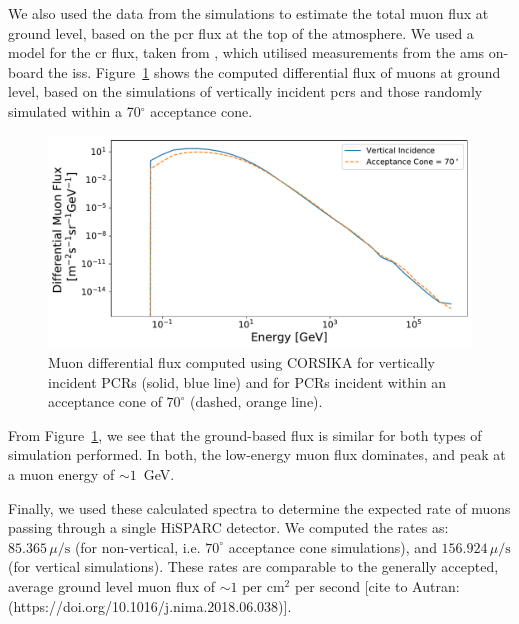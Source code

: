 We also used the data from the simulations to estimate the total muon flux at ground level, based on the \gls{pcr} flux at the top of the atmosphere. We used a model for the \gls{cr} flux, taken from \citet{corti_numerical_2019}, which utilised measurements from the \gls{ams} on-board the \gls{iss}. Figure~\ref{fig:CORSIKA_muon_spectra} shows the computed differential flux of muons at ground level, based on the simulations of vertically incident \glspl{pcr} and those randomly simulated within a 70$^\circ$ acceptance cone.


\begin{figure}[ht!]
	\centering
	\includegraphics[width=\columnwidth]{CORSIKA_Muon_Diff_Flux_Comparison.pdf}
	\caption{Muon differential flux computed using CORSIKA for vertically incident PCRs (solid, blue line) and for PCRs incident within an acceptance cone of $70^\circ$ (dashed, orange line).}
	\label{fig:CORSIKA_muon_spectra}
\end{figure}

From Figure~\ref{fig:CORSIKA_muon_spectra}, we see that the ground-based flux is similar for both types of simulation performed. In both, the low-energy muon flux dominates, and peak at a muon energy of $\sim 1$~GeV.

Finally, we used these calculated spectra to determine the expected rate of muons passing through a single HiSPARC detector. We computed the rates as: $85.365 \, \mu/\mathrm{s}$ (for non-vertical, i.e. $70^\circ$ acceptance cone simulations), and $156.924 \, \mu/\mathrm{s}$ (for vertical simulations). These rates are comparable to the generally accepted, average ground level muon flux of $\sim 1$ per cm$^2$ per second [cite to Autran: (https://doi.org/10.1016/j.nima.2018.06.038)].




